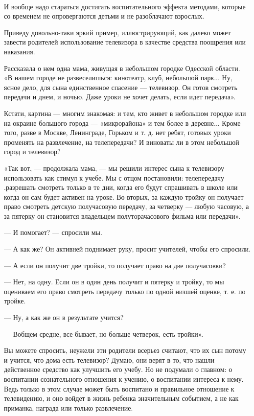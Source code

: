 \documentclass[12pt, a4paper, openany]{book}
\begin{document}
			\ \\
И вообще надо стараться достигать воспитательного эффекта методами, которые со временем не опровергаются детьми и не разоблачают взрослых. 

Приведу довольно-таки яркий пример, иллюстрирующий, как далеко может завести родителей использование телевизора в качестве средства поощрения или наказания. 

Рассказала о нем одна мама, живущая в небольшом городке Одесской области. «В нашем городе не развеселишься: кинотеатр, клуб, небольшой парк... Ну, ясное дело, для сына единственное спасение — телевизор. Он готов смотреть передачи и днем, и ночью. Даже уроки не хочет делать, если идет передача». 

Кстати, картина — многим знакомая: и тем, кто живет в небольшом городке или на окраине большого города — «микрорайона» и тем более в деревне... Кроме того, разве в Москве, Ленинграде, Горьком и т. д. нет ребят, готовых уроки променять на развлечение, на телепередачи? И виноваты ли в этом небольшой город и телевизор? 

«Так вот, — продолжала мама, — мы решили интерес сына к телевизору использовать как стимул к учебе. Мы с отцом постановили: телепередачу .разрешать смотреть только в те дни, когда его будут спрашивать в школе или когда он сам будет активен на уроке. Во-вторых, за каждую тройку он получает право смотреть детскую получасовую передачу, за четверку — любую часовую, а за пятерку он становится владельцем полуторачасового фильма или передачи». 

— И помогает? — спросили мы. 

— А как же? Он активней поднимает руку, просит учителей, чтобы его спросили. 

— А если он получит две тройки, то получает право на две получасовки? 

— Нет, на одну. Если он в один день получит и пятерку и тройку, то мы оцениваем его право смотреть передачу только по одной низшей оценке, т. е. по тройке. 

— Ну, а как же он в результате учится? 

— Вобщем средне, все бывает, но больше четверок, есть тройки». 

Вы можете спросить, неужели эти родители всерьез считают, что их сын потому и учится, что дома есть телевизор? Думаю, они верят в то, что нашли действенное средство как улучшить его учебу. Но не подумали о главном: о воспитании сознательного отношения к учению, о воспитании интереса к нему. Ведь только в этом случае может быть воспитано и правильное отношение к телевидению, и оно войдет в жизнь ребенка значительным событием, а не как приманка, награда или только развлечение. 
\end{document}
